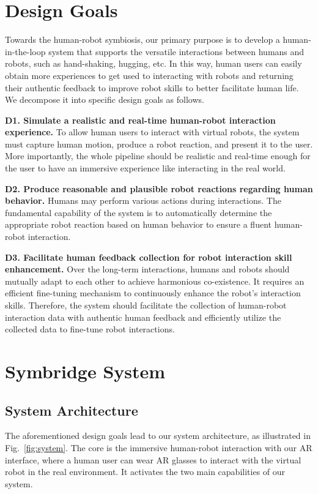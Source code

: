 

\section{Design Goals}

Towards the human-robot symbiosis, our primary purpose is to develop a human-in-the-loop system that supports the versatile interactions between humans and robots, such as hand-shaking, hugging, etc. In this way, human users can easily obtain more experiences to get used to interacting with robots and returning their authentic feedback to improve robot skills to better facilitate human life. We decompose it into specific design goals as follows.

\noindent\textbf{D1. Simulate a realistic and real-time human-robot interaction experience.} To allow human users to interact with virtual robots, the system must capture human motion, produce a robot reaction, and present it to the user. More importantly, the whole pipeline should be realistic and real-time enough for the user to have an immersive experience like interacting in the real world.

\noindent\textbf{D2. Produce reasonable and plausible robot reactions regarding human behavior.} 
Humans may perform various actions during interactions. The fundamental capability of the system is to automatically determine the appropriate robot reaction based on human behavior to ensure a fluent human-robot interaction.

\noindent\textbf{D3. Facilitate human feedback collection for robot interaction skill enhancement.} Over the long-term interactions, humans and robots should mutually adapt to each other to achieve harmonious co-existence. It requires an efficient fine-tuning mechanism to continuously enhance the robot's interaction skills. Therefore, the system should facilitate the collection of human-robot interaction data with authentic human feedback and efficiently utilize the collected data to fine-tune robot interactions.

\section{Symbridge System}
\subsection{System Architecture}

The aforementioned design goals lead to our system architecture, as illustrated in Fig.~\ref{fig:system}. The core is the immersive human-robot interaction with our AR interface, where a human user can wear AR glasses to interact with the virtual robot in the real environment. It activates the two main capabilities of our system.


